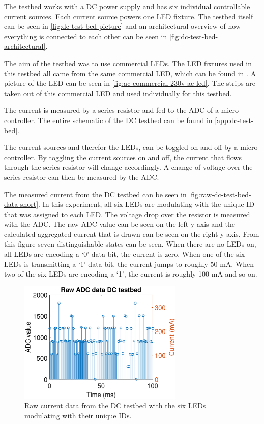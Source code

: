 	The testbed works with a DC power supply and has six individual controllable current sources.
	Each current source powers one LED fixture.
	The testbed itself can be seen in \autoref{fig:dc-test-bed-picture} and an architectural overview of how everything is connected to each other can be seen in \autoref{fig:dc-test-bed-architectural}.


	The aim of the testbed was to use commercial LEDs. 
	The LED fixtures used in this testbed all came from the same commercial LED, which can be found in \cite{commercial-230v-ac-led-aliexpress}.
	A picture of the LED can be seen in \autoref{fig:ac-commercial-230v-ac-led}.
	The strips are taken out of this commercial LED and used individually for this testbed.


	The current is measured by a series resistor and fed to the ADC of a micro-controller.
	The entire schematic of the DC testbed can be found in \autoref{app:dc-test-bed}. 

	The current sources and therefor the LEDs, can be toggled on and off by a micro-controller.
	By toggling the current sources on and off, the current that flows through the series resistor will change accordingly.
	A change of voltage over the series resistor can then be measured by the ADC.

	The measured current from the DC testbed can be seen in \autoref{fig:raw-dc-test-bed-data-short}.
	In this experiment, all six LEDs are modulating with the unique ID that was assigned to each LED.
	The voltage drop over the resistor is measured with the ADC.
	The raw ADC value can be seen on the left y-axis and the calculated aggregated current that is drawn can be seen on the right y-axis.
	From this figure seven distinguishable states can be seen.
	When there are no LEDs on, all LEDs are encoding a `0' data bit, the current is zero.
	When one of the six LEDs is transmitting a `1' data bit, the current jumps to roughly 50 mA.
	When two of the six LEDs are encoding a `1', the current is roughly 100 mA and so on.


	\begin{figure}
		\centering
		\includegraphics[angle=0,width=0.7\textwidth,keepaspectratio]{chapters/hardware-chapters/DC/dc-test-bed/dc-test-bed-raw-data.eps}
		\caption{Raw current data from the DC testbed with the six LEDs modulating with their unique IDs.}
		\label{fig:raw-dc-test-bed-data-short}
	\end{figure}



